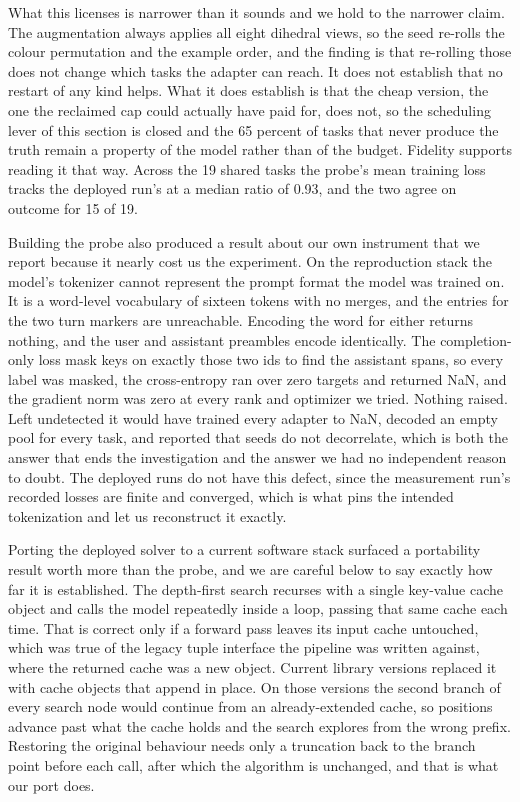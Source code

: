 \documentclass[11pt]{article}
\begin{document}
What this licenses is narrower than it sounds and we hold to the narrower claim. The augmentation
always applies all eight dihedral views, so the seed re-rolls the colour permutation and the example
order, and the finding is that re-rolling those does not change which tasks the adapter can reach. It
does not establish that no restart of any kind helps. What it does establish is that the cheap version,
the one the reclaimed cap could actually have paid for, does not, so the scheduling lever of this
section is closed and the 65 percent of tasks that never produce the truth remain a property of the
model rather than of the budget. Fidelity supports reading it that way. Across the 19 shared tasks the
probe's mean training loss tracks the deployed run's at a median ratio of 0.93, and the two agree on
outcome for 15 of 19.

Building the probe also produced a result about our own instrument that we report because it nearly cost
us the experiment. On the reproduction stack the model's tokenizer cannot represent the prompt format the
model was trained on. It is a word-level vocabulary of sixteen tokens with no merges, and the entries
for the two turn markers are unreachable. Encoding the word for either returns nothing, and the user
and assistant preambles encode identically. The completion-only loss mask keys on exactly those two
ids to find the assistant spans, so every label was masked, the cross-entropy ran over zero targets and
returned NaN, and the gradient norm was zero at every rank and optimizer we tried. Nothing raised. Left
undetected it would have trained every adapter to NaN, decoded an empty pool for every task, and
reported that seeds do not decorrelate, which is both the answer that ends the investigation and the
answer we had no independent reason to doubt. The deployed runs do not have this defect, since the
measurement run's recorded losses are finite and converged, which is what pins the intended
tokenization and let us reconstruct it exactly.

Porting the deployed solver to a current software stack surfaced a portability result worth more than
the probe, and we are careful below to say exactly how far it is established. The depth-first search
recurses with a single key-value cache object and calls the model repeatedly inside a loop, passing that
same cache each time. That is correct only if a forward pass leaves its input cache untouched, which was
true of the legacy tuple interface the pipeline was written against, where the returned cache was a new
object. Current library versions replaced it with cache objects that append in place. On those versions
the second branch of every search node would continue from an already-extended cache, so positions
advance past what the cache holds and the search explores from the wrong prefix. Restoring the original
behaviour needs only a truncation back to the branch point before each call, after which the algorithm
is unchanged, and that is what our port does.
\end{document}
